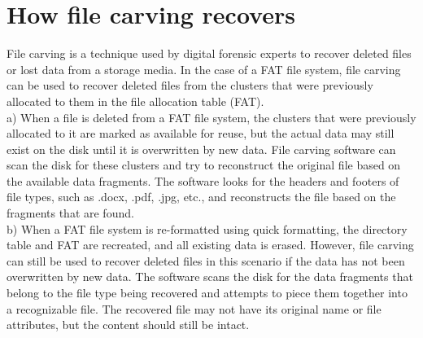\documentclass{scrreprt}
\begin{document}
\section{How file carving recovers}
File carving is a technique used by digital forensic experts to recover deleted files or lost data from a storage media. In the case of a FAT file system, file carving can be used to recover deleted files from the clusters that were previously allocated to them in the file allocation table (FAT).
\\\newline a) When a file is deleted from a FAT file system, the clusters that were previously allocated to it are marked as available for reuse, but the actual data may still exist on the disk until it is overwritten by new data. File carving software can scan the disk for these clusters and try to reconstruct the original file based on the available data fragments. The software looks for the headers and footers of file types, such as .docx, .pdf, .jpg, etc., and reconstructs the file based on the fragments that are found.
\\\newline b) When a FAT file system is re-formatted using quick formatting, the directory table and FAT are recreated, and all existing data is erased. However, file carving can still be used to recover deleted files in this scenario if the data has not been overwritten by new data. The software scans the disk for the data fragments that belong to the file type being recovered and attempts to piece them together into a recognizable file. The recovered file may not have its original name or file attributes, but the content should still be intact.
\end{document}
